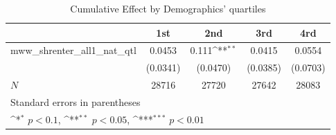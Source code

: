 \begin{table}[htbp]\centering
\def\sym#1{\ifmmode^{#1}\else\(^{#1}\)\fi}
\caption{Cumulative Effect by Demographics' quartiles}
\begin{tabular}{l*{4}{c}}
\hline\hline
            &\multicolumn{1}{c}{1st}&\multicolumn{1}{c}{2nd}&\multicolumn{1}{c}{3rd}&\multicolumn{1}{c}{4rd}\\
\hline
mww\_shrenter\_all1\_nat\_qtl&      0.0453         &       0.111\sym{**} &      0.0415         &      0.0554         \\
            &    (0.0341)         &    (0.0470)         &    (0.0385)         &    (0.0703)         \\
\hline
\(N\)       &       28716         &       27720         &       27642         &       28083         \\
\hline\hline
\multicolumn{5}{l}{\footnotesize Standard errors in parentheses}\\
\multicolumn{5}{l}{\footnotesize \sym{*} \(p<0.1\), \sym{**} \(p<0.05\), \sym{***} \(p<0.01\)}\\
\end{tabular}
\end{table}
